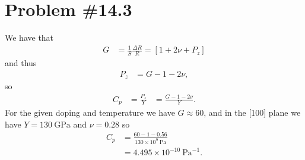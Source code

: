 \documentclass{article}
\begin{document}
\section*{Problem \#14.3}
We have that
\begin{align*}
  G &= \frac{1}{S}\frac{\Delta R}{R} = [1 + 2\nu + P_z]
\end{align*}
and thus
\begin{align*}
P_z &= G - 1 - 2\nu,
\end{align*}
so
\begin{align*}
C_p &= \frac{P_z}{Y} &= \frac{G - 1 - 2\nu}{Y}.
\end{align*}
For the given doping and temperature we have $G \approx 60$, and
in the [100] plane we have $Y = 130 ~\mathrm{GPa}$ and $\nu = 0.28$ so
\begin{align*}
C_p &= \frac{60 - 1 - 0.56}{130 \times 10^{9} ~\mathrm{Pa}} \\
    &= 4.495 \times 10^{-10} ~\mathrm{Pa}^{-1}.
\end{align*}

\pagebreak 
\end{document}
